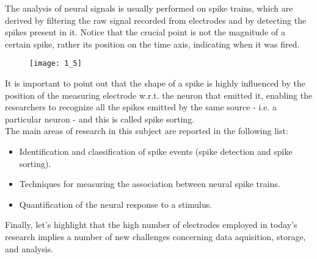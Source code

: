 The analysis of neural signals is usually performed on spike trains, which are
derived by filtering the raw signal recorded from electrodes and by detecting the
spikes present in it. Notice that the crucial point is not the magnitude of a
certain spike, rather its position on the time axis, indicating when it was fired.
\begin{figure}[H]
    \texttt{[image: 1\_5]}
    \centering
\end{figure}
It is important to point out that the shape of a spike is highly influenced by the
position of the measuring electrode w.r.t. the neuron that emitted it, enabling
the researchers to recognize all the spikes emitted by the same source - i.e. a
particular neuron - and this is called spike sorting.\\
The main areas of research in this subject are reported in the following list:
\begin{itemize}
    \item Identification and classification of spike events (spike detection and
          spike sorting).
    \item Techniques for measuring the association between neural spike trains.
    \item Quantification of the neural response to a stimulus.
\end{itemize}
Finally, let's highlight that the high number of electrodes employed in today's
research implies a number of new challenges concerning data aquisition, storage,
and analysis.